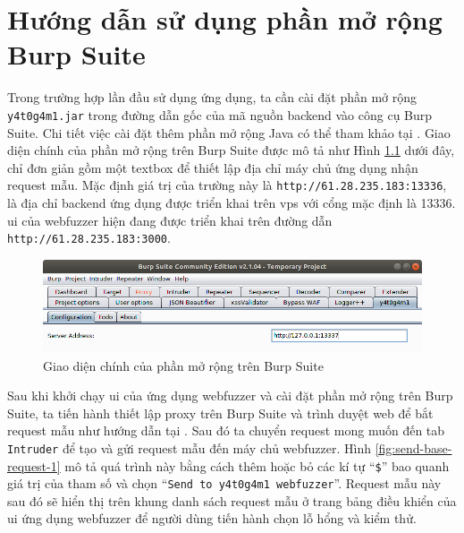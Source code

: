 \cleardoublepage
\appendix
\chapter{Hướng dẫn sử dụng phần mở rộng Burp Suite}
Trong trường hợp lần đầu sử dụng ứng dụng, ta cần cài đặt phần mở rộng \texttt{y4t0g4m1.jar} trong đường dẫn gốc của mã nguồn backend vào công cụ Burp Suite. Chi tiết việc cài đặt thêm phần mở rộng Java có thể tham khảo tại \parencite{burp-suite-extension-setup}. Giao diện chính của phần mở rộng trên Burp Suite được mô tả như Hình \ref{fig:main-burp-extension-interface} dưới đây, chỉ đơn giản gồm một textbox để thiết lập địa chỉ máy chủ ứng dụng nhận request mẫu. Mặc định giá trị của trường này là \texttt{http://61.28.235.183:13336}, là địa chỉ backend ứng dụng được triển khai trên \acrshort{vps} với cổng mặc định là 13336. \acrshort{ui} của webfuzzer hiện đang được triển khai trên đường dẫn \texttt{http://61.28.235.183:3000}.
\begin{figure}[H]
  \centering
    \includegraphics[width=\textwidth,keepaspectratio=true]{images/main-burp-extension-interface.png}
  \caption{Giao diện chính của phần mở rộng trên Burp Suite}
  \label{fig:main-burp-extension-interface}
\end{figure}
Sau khi khởi chạy \acrshort{ui} của ứng dụng webfuzzer và cài đặt phần mở rộng trên Burp Suite, ta tiến hành thiết lập proxy trên Burp Suite và trình duyệt web để bắt request mẫu như hướng dẫn tại \parencite{burp-suite-proxy}. Sau đó ta chuyển request mong muốn đến tab \texttt{Intruder} để tạo và gửi request mẫu đến máy chủ webfuzzer. Hình \ref{fig:send-base-request-1} mô tả quá trình này bằng cách thêm hoặc bỏ các kí tự ``\texttt{\$}'' bao quanh giá trị của tham số và chọn ``\texttt{Send to y4t0g4m1 webfuzzer}''. Request mẫu này sau đó sẽ hiển thị trên khung danh sách request mẫu ở trang bảng điều khiển của \acrshort{ui} ứng dụng webfuzzer để người dùng tiến hành chọn lỗ hổng và kiểm thử.
